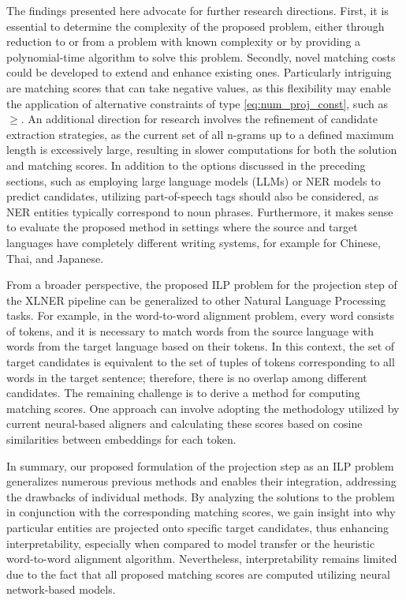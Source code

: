 The findings presented here advocate for further research directions.
First, it is essential to determine the complexity of the proposed problem, either through
reduction to or from a problem with known complexity or by providing a polynomial-time algorithm to solve this problem.
Secondly, novel matching costs could be developed to extend and enhance existing ones. Particularly
intriguing are matching scores that can take negative values, as this flexibility may enable the
application of alternative constraints of type \eqref{eq:num_proj_const}, such as \( \geq \).
An additional direction for research involves the refinement of candidate extraction strategies,
as the current set of all n-grams up to a defined maximum length is excessively large, resulting
in slower computations for both the solution and matching scores. In addition to the options
discussed in the preceding sections, such as employing large language models (LLMs) or NER models
to predict candidates, utilizing part-of-speech tags should also be considered, as NER entities
typically correspond to noun phrases. Furthermore, it makes sense to evaluate the proposed method in
settings where the source and target languages have completely different writing systems, for example
for Chinese, Thai, and Japanese.

From a broader perspective, the proposed ILP problem for the projection step of the XLNER pipeline
can be generalized to other Natural Language Processing tasks. For example, in the word-to-word
alignment problem, every word consists of tokens, and it is necessary to match words from the source
language with words from the target language based on their tokens. In this context, the set of target
candidates is equivalent to the set of tuples of tokens corresponding to all words in the target
sentence; therefore, there is no overlap among different candidates. The remaining challenge
is to derive a method for computing matching scores. One approach can involve adopting the methodology
utilized by current neural-based aligners and calculating these scores based on cosine similarities
between embeddings for each token.

In summary, our proposed formulation of the projection step as an ILP problem generalizes numerous
previous methods and enables their integration, addressing the drawbacks of individual methods.
By analyzing the solutions to the problem in conjunction with the corresponding matching scores,
we gain insight into why particular entities are projected onto specific target candidates, thus
enhancing interpretability, especially when compared to model transfer or the heuristic word-to-word
alignment algorithm. Nevertheless, interpretability remains limited due to the fact that all
proposed matching scores are computed utilizing neural network-based models.
